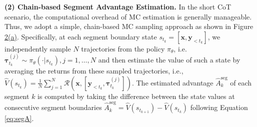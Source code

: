 \noindent\textbf{(2) Chain-based Segment Advantage Estimation.}
\label{subsec:chain-like-segment-advantage-estimaiton}
In the short CoT scenario, the computational overhead of MC estimation is generally manageable. Thus, we adopt a simple, chain-based MC sampling approach as shown in Figure \hyperref[fig:sampling_method]{2(a)}. Specifically, at each segment boundary state \( s_{t_k} = [\boldsymbol x, \boldsymbol y_{<t_k}] \), we independently sample \( N \) trajectories from the policy \(\pi_{\theta}\), i.e. \( \boldsymbol\tau_{t_k}^{(j)} \sim \pi_{\theta}(\cdot|s_{t_k}), j=1,\dots, N \) and then estimate the value of such a state by averaging the returns from these sampled trajectories, i.e., \( \hat V(s_{t_k}) = \frac{1}{N}\sum_{j=1}^{N}\mathcal{R}(\boldsymbol x, [\boldsymbol y_{<t_k},\boldsymbol\tau_{t_k}^{(j)}]) \). The estimated advantage $\hat A^{\mathrm{seg}}_k$ of each segment \(k\) is computed by taking the difference between the state values at consecutive segment boundaries $\hat A_k^{\mathrm{seg}} = \hat V(s_{t_{k+1}}) - \hat V(s_{t_k})$ following Equation \eqref{eq:segA}.

